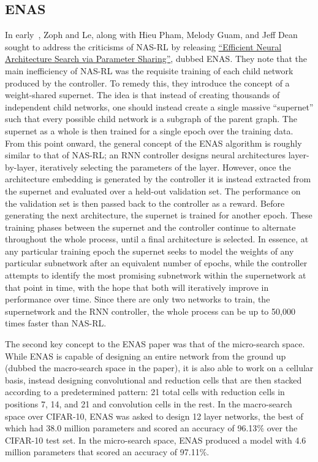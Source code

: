 \subsection{ENAS}
In early~\citeyear{pham2018}, Zoph and Le, along with Hieu Pham, Melody Guam, and Jeff Dean sought to address
the criticisms of NAS-RL by releasing \hyperlink{cite.pham2018}{``Efficient Neural Architecture Search via Parameter Sharing''}, dubbed ENAS.
They note that the main inefficiency of NAS-RL was the requisite training of each child network produced by the controller.
To remedy this, they introduce the concept of a weight-shared supernet. The idea is that instead of creating thousands of
independent child networks, one should instead create a single massive ``supernet'' such that every possible child network is a subgraph of the parent graph.
The supernet as a whole is then trained for a single epoch over the training data. From this point onward, the general concept
of the ENAS algorithm is roughly similar to that of NAS-RL; an RNN controller designs neural architectures layer-by-layer,
iteratively selecting the parameters of the layer. However, once the architecture embedding is generated by the controller
it is instead extracted from the supernet and evaluated over a held-out validation set. The performance on the validation set
is then passed back to the controller as a reward. Before generating the next architecture, the supernet is trained for another
epoch. These training phases between the supernet and the controller continue to alternate throughout the whole process, until a
final architecture is selected. In essence, at any particular training epoch the supernet seeks to model the weights of
any particular subnetwork after an equivalent number of epochs, while the controller attempts to identify the most promising
subnetwork within the supernetwork at that point in time, with the hope that both will iteratively improve in performance
over time. Since there are only two networks to train, the supernetwork and the RNN controller, the whole process can be up to
50,000 times faster than NAS-RL.

The second key concept to the ENAS paper was that of the micro-search space. While ENAS is capable of designing an entire network
from the ground up (dubbed the macro-search space in the paper), it is also able to work on a cellular basis, instead designing
convolutional and reduction cells that are then stacked according to a predetermined pattern:
21 total cells with reduction cells in positions 7, 14, and 21 and convolution cells in the rest. In the macro-search space over
CIFAR-10, ENAS was asked to design 12 layer networks, the best of which had 38.0 million parameters and scored
an accuracy of 96.13$\%$ over the CIFAR-10 test set. In the micro-search space, ENAS produced a model with 4.6 million parameters
that scored an accuracy of 97.11$\%$.

